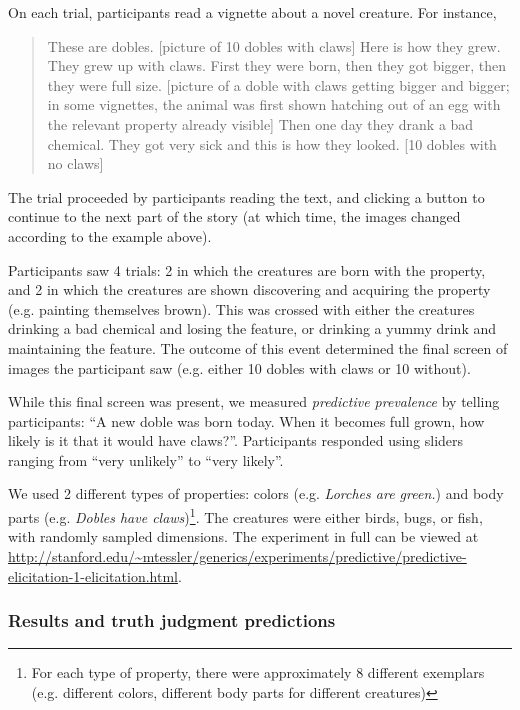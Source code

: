 \documentclass[12pt,letterpaper]{article}
\begin{document}
On each trial, participants read a vignette about a novel creature. For instance,
\begin{quote}
These are dobles. [picture of 10 dobles with claws] Here is how they grew. They grew up with claws. First they were born, then they got bigger, then they were full size. [picture of a doble with claws getting bigger and bigger; in some vignettes, the animal was first shown hatching out of an egg with the relevant property already visible] Then one day they drank a bad chemical. They got very sick and this is how they looked. [10 dobles with no claws]
\end{quote}
The trial proceeded by participants reading the text, and clicking a button to continue to the next part of the story (at which time, the images changed according to the example above).

Participants saw 4 trials: 2 in which the creatures are born with the property, and 2 in which the creatures are shown discovering and acquiring the property (e.g. painting themselves brown).
This was crossed with either the creatures drinking a bad chemical and losing the feature, or drinking a yummy drink and maintaining the feature.
The outcome of this event determined the final screen of images the participant saw (e.g. either 10 dobles with claws or 10 without).

While this final screen was present, we measured \emph{predictive prevalence} by telling participants: ``A new doble was born today. When it becomes full grown, how likely is it that it would have claws?''.
Participants responded using sliders ranging from ``very unlikely'' to ``very likely''.

We used 2 different types of properties: colors (e.g. \emph{Lorches are green.}) and body parts (e.g. \emph{Dobles have claws})\footnote{
For each type of property, there were approximately 8 different exemplars (e.g. different colors, different body parts for different creatures)}.
The creatures were either birds, bugs, or fish, with randomly sampled dimensions.
The experiment in full can be viewed at \url{http://stanford.edu/~mtessler/generics/experiments/predictive/predictive-elicitation-1-elicitation.html}.


\subsubsection*{Results and truth judgment predictions}
\end{document}
